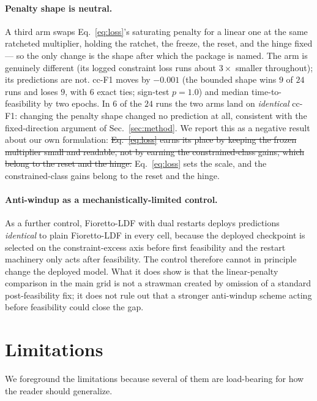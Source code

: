 \documentclass[10pt]{article}
\newcommand{\del}[1]{{\color{red}\sout{#1}}}
\begin{document}
\paragraph{Penalty shape is neutral.}
A third arm swaps Eq.~\eqref{eq:loss}'s saturating penalty for a linear
one at the same ratcheted multiplier, holding the ratchet, the freeze,
the reset, and the hinge fixed --- so the only change is the shape after
which the package is named. The arm is genuinely different (its logged
constraint loss runs about $3\times$ smaller throughout); its
predictions are not. cc-F1 moves by $-0.001$ (the bounded shape wins $9$
of $24$ runs and loses $9$, with $6$ exact ties; sign-test $p{=}1.0$)
and median time-to-feasibility by two epochs. In $6$ of the $24$ runs the
two arms land on \emph{identical} cc-F1: changing the penalty shape
changed no prediction at all, consistent with the fixed-direction
argument of Sec.~\ref{sec:method}. We report this as a negative result
about our own formulation: \del{Eq.~\eqref{eq:loss} earns its place by keeping
the frozen multiplier small and readable, not by earning the
constrained-class gains, which belong to the reset and the hinge.}%
{\color{blue}Eq.~\eqref{eq:loss} sets the scale, and the constrained-class
gains belong to the reset and the hinge.}

\paragraph{Anti-windup as a mechanistically-limited control.}
As a further control, Fioretto-LDF with dual restarts
\citep{gallego2022controlled} deploys predictions \emph{identical} to
plain Fioretto-LDF in every cell, because the deployed checkpoint is
selected on the constraint-excess axis before first feasibility and the
restart machinery only acts after feasibility. The control therefore
cannot in principle change the deployed model. What it does show is that
the linear-penalty comparison in the main grid is not a strawman created
by omission of a standard post-feasibility fix; it does not rule out
that a stronger anti-windup scheme acting before feasibility could close
the gap.

\section{Limitations}
\label{sec:limits}

We foreground the limitations because several of them are load-bearing for
how the reader should generalize.
\end{document}
